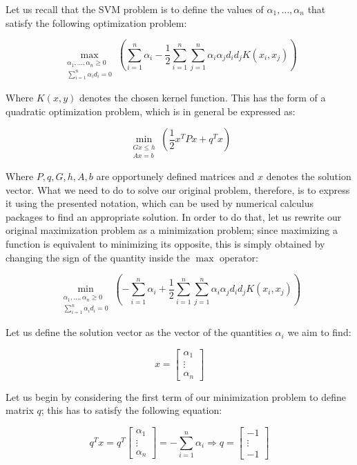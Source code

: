 \documentclass[letterpaper,headings=standardclasses]{scrartcl}
\begin{document}
Let us recall that the SVM problem is to define the values of $\alpha_1, \dots, \alpha_n$ that satisfy the following optimization problem:

$$ \max_{\substack{\alpha_1, \dots, \alpha_n \ge 0 \\ \scriptstyle \sum_{i = 1}^n \alpha_i d_i = 0}}{\left( \sum_{i = 1}^n \alpha_i - \frac{1}{2} \sum_{i = 1}^n \sum_{j = 1}^n \alpha_i \alpha_j d_i d_j K(x_i, x_j) \right)} $$

Where $K(x,y)$ denotes the chosen kernel function. This has the form of a quadratic optimization problem, which is in general be expressed as:

$$ \min_{\substack{Gx \le h \\ \scriptstyle Ax = b}}{\left( \frac{1}{2} x^T P x + q^T x \right)} $$

Where $P, q, G, h, A, b$ are opportunely defined matrices and $x$ denotes the solution vector. What we need to do to solve our original problem, therefore, is to express it using the presented notation, which can be used by numerical calculus packages to find an appropriate solution. In order to do that, let us rewrite our original maximization problem as a minimization problem; since maximizing a function is equivalent to minimizing its opposite, this is simply obtained by changing the sign of the quantity inside the $\max$ operator:

$$ \min_{\substack{\alpha_1, \dots, \alpha_n \ge 0 \\ \scriptstyle \sum_{i = 1}^n \alpha_i d_i = 0}}{\left( - \sum_{i = 1}^n \alpha_i + \frac{1}{2} \sum_{i = 1}^n \sum_{j = 1}^n \alpha_i \alpha_j d_i d_j K(x_i, x_j) \right)} $$

Let us define the solution vector as the vector of the quantities $\alpha_i$ we aim to find:

$$ x = \left[ \begin{matrix} \alpha_1 \\ \vdots \\ \alpha_n \end{matrix} \right] $$

Let us begin by considering the first term of our minimization problem to define matrix $q$; this has to satisfy the following equation:

$$ q^T x = q^T \left[ \begin{matrix} \alpha_1 \\ \vdots \\ \alpha_n \end{matrix} \right] = - \sum_{i = 1}^n \alpha_i \Rightarrow q = \left[ \begin{matrix} -1 \\ \vdots \\ -1 \end{matrix} \right] $$
\end{document}
